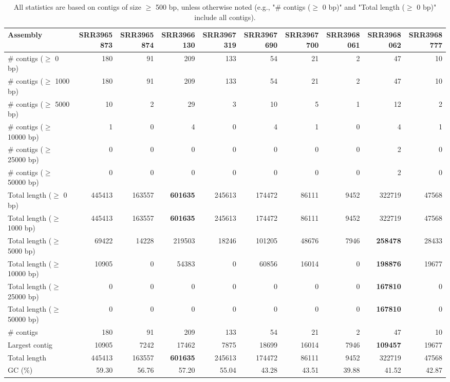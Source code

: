 \documentclass[12pt,a4paper]{article}
\begin{document}
\begin{table}[ht]
\begin{center}
\caption{All statistics are based on contigs of size $\geq$ 500 bp, unless otherwise noted (e.g., "\# contigs ($\geq$ 0 bp)" and "Total length ($\geq$ 0 bp)" include all contigs).}
\begin{tabular}{|l*{9}{|r}|}
\hline
Assembly & SRR3965873 & SRR3965874 & SRR3966130 & SRR3967319 & SRR3967690 & SRR3967700 & SRR3968061 & SRR3968062 & SRR3968777 \\ \hline
\# contigs ($\geq$ 0 bp) & 180 & 91 & 209 & 133 & 54 & 21 & 2 & 47 & 10 \\ \hline
\# contigs ($\geq$ 1000 bp) & 180 & 91 & 209 & 133 & 54 & 21 & 2 & 47 & 10 \\ \hline
\# contigs ($\geq$ 5000 bp) & 10 & 2 & 29 & 3 & 10 & 5 & 1 & 12 & 2 \\ \hline
\# contigs ($\geq$ 10000 bp) & 1 & 0 & 4 & 0 & 4 & 1 & 0 & 4 & 1 \\ \hline
\# contigs ($\geq$ 25000 bp) & 0 & 0 & 0 & 0 & 0 & 0 & 0 & 2 & 0 \\ \hline
\# contigs ($\geq$ 50000 bp) & 0 & 0 & 0 & 0 & 0 & 0 & 0 & 2 & 0 \\ \hline
Total length ($\geq$ 0 bp) & 445413 & 163557 & {\bf 601635} & 245613 & 174472 & 86111 & 9452 & 322719 & 47568 \\ \hline
Total length ($\geq$ 1000 bp) & 445413 & 163557 & {\bf 601635} & 245613 & 174472 & 86111 & 9452 & 322719 & 47568 \\ \hline
Total length ($\geq$ 5000 bp) & 69422 & 14228 & 219503 & 18246 & 101205 & 48676 & 7946 & {\bf 258478} & 28433 \\ \hline
Total length ($\geq$ 10000 bp) & 10905 & 0 & 54383 & 0 & 60856 & 16014 & 0 & {\bf 198876} & 19677 \\ \hline
Total length ($\geq$ 25000 bp) & 0 & 0 & 0 & 0 & 0 & 0 & 0 & {\bf 167810} & 0 \\ \hline
Total length ($\geq$ 50000 bp) & 0 & 0 & 0 & 0 & 0 & 0 & 0 & {\bf 167810} & 0 \\ \hline
\# contigs & 180 & 91 & 209 & 133 & 54 & 21 & 2 & 47 & 10 \\ \hline
Largest contig & 10905 & 7242 & 17462 & 7875 & 18699 & 16014 & 7946 & {\bf 109457} & 19677 \\ \hline
Total length & 445413 & 163557 & {\bf 601635} & 245613 & 174472 & 86111 & 9452 & 322719 & 47568 \\ \hline
GC (\%) & 59.30 & 56.76 & 57.20 & 55.04 & 43.28 & 43.51 & 39.88 & 41.52 & 42.87 \\ \hline

\end{tabular}
\end{center}
\end{table}
\end{document}
